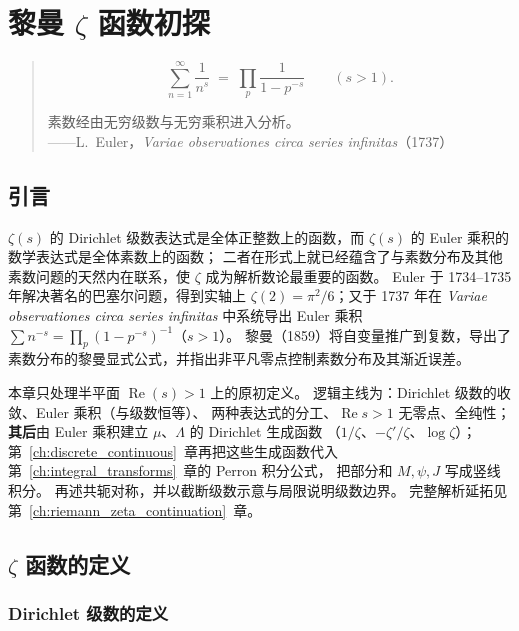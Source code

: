 
\chapter{黎曼 \texorpdfstring{$\zeta$}{Zeta} 函数初探}\label{ch:riemann_zeta_intro}

\vspace{0.6em}
\begin{quote}
\small
\[
  \sum_{n=1}^{\infty}\frac{1}{n^{s}}
  \;=\;
  \prod_{p}\frac{1}{1-p^{-s}}
  \qquad (s>1).
\]
{\raggedright
素数经由无穷级数与无穷乘积进入分析。\\[2pt]
\hfill——L.~Euler，\textit{Variae observationes circa series infinitas}（1737）}
\end{quote}
\vspace{0.6em}

\section{引言}\label{sec:intro_zeta_intro}

$\zeta(s)$ 的 Dirichlet 级数表达式是全体正整数上的函数，而 $\zeta(s)$ 的 Euler 乘积的数学表达式是全体素数上的函数；
二者在形式上就已经蕴含了与素数分布及其他素数问题的天然内在联系，使 $\zeta$ 成为解析数论最重要的函数。
Euler 于 1734--1735 年解决著名的巴塞尔问题，得到实轴上
$\zeta(2)=\pi^2/6$；又于 1737 年在
\textit{Variae observationes circa series infinitas} 中系统导出 Euler 乘积
$\sum n^{-s}=\prod_p(1-p^{-s})^{-1}$（$s>1$）。
黎曼（1859）将自变量推广到复数，导出了素数分布的黎曼显式公式，并指出非平凡零点控制素数分布及其渐近误差。

本章只处理半平面 $\operatorname{Re}(s)>1$ 上的原初定义。
逻辑主线为：Dirichlet 级数的收敛、Euler 乘积（与级数恒等）、
两种表达式的分工、$\operatorname{Re}s>1$ 无零点、全纯性；
\textbf{其后}由 Euler 乘积建立 $\mu$、$\Lambda$ 的 Dirichlet 生成函数
（$1/\zeta$、$-\zeta'/\zeta$、$\log\zeta$）；
第~\ref{ch:discrete_continuous}~章再把这些生成函数代入第~\ref{ch:integral_transforms}~章的 Perron 积分公式，
把部分和 $M,\psi,J$ 写成竖线积分。
再述共轭对称，并以截断级数示意与局限说明级数边界。
完整解析延拓见第~\ref{ch:riemann_zeta_continuation}~章。

\section{\texorpdfstring{$\zeta$}{Zeta(s)} 函数的定义}
\subsection{Dirichlet 级数的定义}

